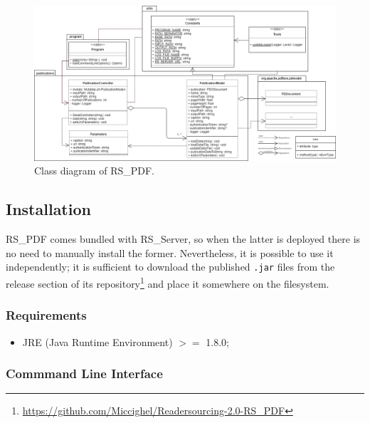 \documentclass[a4paper, english]{article}
\begin{document}
\begin{figure}[!tbp]
\centering
\includegraphics[scale=0.55, angle=90]{figures/classi-2.png}
\caption{Class diagram of RS\_PDF.}
\label{fig:classi-2}
\end{figure}

\subsection{Installation}

RS\_PDF comes bundled with RS\_Server, so when the latter is deployed there is no need to manually install the former. Nevertheless, it is possible to use it independently; it is sufficient to download the published \verb|.jar| files from the release section of its repository\footnote{\url{https://github.com/Miccighel/Readersourcing-2.0-RS_PDF}} and place it somewhere on the filesystem.

\subsubsection{Requirements}

\begin{itemize}
\item JRE (Java Runtime Environment) $>=$ 1.8.0;
\end{itemize}

\subsubsection{Commmand Line Interface}
\end{document}
